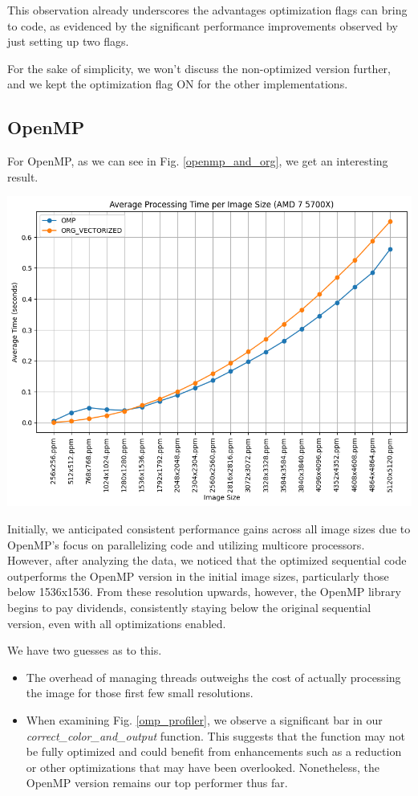 \documentclass[sigconf]{acmart}
\begin{document}
This observation already underscores the advantages optimization flags can bring to code, as evidenced by the significant performance improvements observed by just setting up two flags.

For the sake of simplicity, we won't discuss the non-optimized version further, and we kept the optimization flag ON for the other implementations.


\subsection{OpenMP}

For OpenMP, as we can see in Fig. \ref{openmp_and_org}, we get an interesting result. 

\begin{center}
    \includegraphics[width=0.8\linewidth]{vizs/omp_and_org.png}
    \label{openmp_and_org}
\end{center}

Initially, we anticipated consistent performance gains across all image sizes due to OpenMP's focus on parallelizing code and utilizing multicore processors. However, after analyzing the data, we noticed that the optimized sequential code outperforms the OpenMP version in the initial image sizes, particularly those below 1536x1536. From these resolution upwards, however, the OpenMP library begins to pay dividends, consistently staying below the original sequential version, even with all optimizations enabled. 

We have two guesses as to this.

\begin{itemize}
    \item The overhead of managing threads outweighs the cost of actually processing the image for those first few small resolutions.
    \item When examining Fig. \ref{omp_profiler}, we observe a significant bar in our \textit{correct\_color\_and\_output} function. This suggests that the function may not be fully optimized and could benefit from enhancements such as a reduction or other optimizations that may have been overlooked. Nonetheless, the OpenMP version remains our top performer thus far.
\end{itemize}
\end{document}
